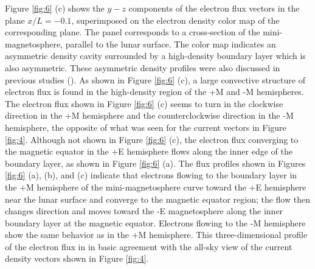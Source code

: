 \documentclass[draft,jgrga]{agutex2015}
\begin{document}
\begin{article}
Figure \ref{fig:6} (c) shows the $y-z$ components of the electron flux 
vectors in the plane $x/L=-0.1$, 
superimposed on the electron density color map of the corresponding plane.
The panel corresponds to a cross-section of the mini-magnetosphere, 
parallel to the lunar surface.
The color map indicates an asymmetric density cavity 
surrounded by a high-density boundary layer which is also asymmetric.
These asymmetric density profiles were also discussed in previous studies
(\cite{Deca2014}).
As shown in Figure \ref{fig:6} (c),
a large convective structure of electron flux is found 
in the high-density region of the +M and -M hemispheres.
%
%
The electron flux shown in Figure \ref{fig:6} (c) seems to turn 
in the clockwise direction in the +M hemisphere and the 
counterclockwise direction in the -M hemisphere, the opposite of what was seen for the current vectors in Figure \ref{fig:4}.
%
Although not shown in Figure \ref{fig:6} (c), 
the electron flux converging to the magnetic equator in
the +E hemisphere flows along the inner edge of the boundary layer, 
as shown in Figure \ref{fig:6} (a).
The flux profiles shown in Figures \ref{fig:6} (a), (b), and (c) indicate 
that electrons flowing 
to the boundary layer in the +M hemisphere of the mini-magnetosphere
curve toward the +E hemisphere 
near the lunar surface and converge to the magnetic equator region; 
the flow then changes direction and moves toward the -E magnetosphere
along the inner boundary layer at the magnetic equator.
Electrons flowing to the -M hemisphere show the
same behavior as in the +M hemisphere.
This three-dimensional profile of the electron flux in in basic agreement 
with the all-sky view of the current density vectors 
shown in Figure \ref{fig:4}.


\end{article}
\end{document}
